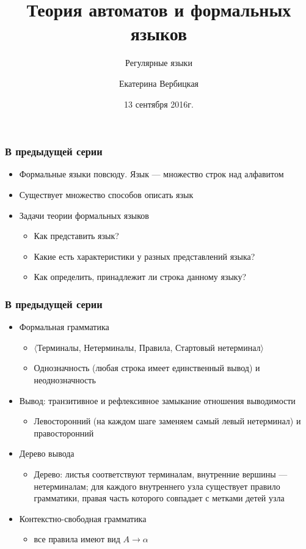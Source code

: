 \documentclass{beamer}
\title[]{Теория автоматов и формальных языков}
\subtitle[]{Регулярные языки}
\institute[]{
Санкт-Петербургский государственный электротехнический университет <<ЛЭТИ>>\\
}
\author[]{Екатерина Вербицкая}
\date{13 сентября 2016г.}
\begin{document}
{
  \begin{frame}
    \titlepage
  \end{frame}
}

\begin{frame}[fragile]
  \transwipe[direction=90]
  \frametitle{В предыдущей серии}
  \begin{itemize}
    \item Формальные языки повсюду. Язык --- множество строк над алфавитом
    \item Существует множество способов описать язык
    \item Задачи теории формальных языков
    \begin{itemize}
      \item Как представить язык?
      \item Какие есть характеристики у разных представлений языка?
      \item Как определить, принадлежит ли строка данному языку?
    \end{itemize}
  \end{itemize}
\end{frame}

\begin{frame}[fragile]
  \transwipe[direction=90]
  \frametitle{В предыдущей серии}
  \begin{itemize}
    \item Формальная грамматика 
    \begin{itemize}
      \item $\langle$Терминалы, Нетерминалы, Правила, Стартовый нетерминал$\rangle$
      \item Однозначность (любая строка имеет единственный вывод) и неоднозначность
    \end{itemize}
   \item Вывод: транзитивное и рефлексивное замыкание отношения выводимости
   \begin{itemize}
     \item Левосторонний (на каждом шаге заменяем самый левый нетерминал) и правосторонний
   \end{itemize}
   \item Дерево вывода
   \begin{itemize}
     \item Дерево: листья соответствуют терминалам, внутренние вершины --- нетерминалам; для каждого внутреннего узла существует правило грамматики, правая часть которого совпадает с метками детей узла
   \end{itemize}
    \item  Контекстно-свободная грамматика
      \begin{itemize}
        \item все правила имеют вид $A \rightarrow \alpha$
        
      \end{itemize}

      \end{itemize}

\end{frame}
\end{document}
